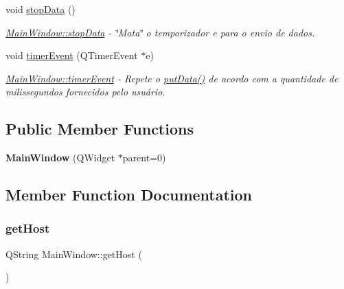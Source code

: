 \begin{DoxyCompactItemize}
void \mbox{\hyperlink{class_main_window_a79fdaf1fd769f0584f50da34e415b3de}{stop\+Data}} ()
\begin{DoxyCompactList}\small\item\em \mbox{\hyperlink{class_main_window_a79fdaf1fd769f0584f50da34e415b3de}{Main\+Window\+::stop\+Data}} -\/ \char`\"{}\+Mata\char`\"{} o temporizador e para o envio de dados. \end{DoxyCompactList}\item 
\mbox{\label{class_main_window_a9d08a694a5f9c532225754381b8011ea}} 
void \mbox{\hyperlink{class_main_window_a9d08a694a5f9c532225754381b8011ea}{timer\+Event}} (Q\+Timer\+Event $\ast$e)
\begin{DoxyCompactList}\small\item\em \mbox{\hyperlink{class_main_window_a9d08a694a5f9c532225754381b8011ea}{Main\+Window\+::timer\+Event}} -\/ Repete o \mbox{\hyperlink{class_main_window_afdfeb13ec363b0eb8ecacaf0aa13b605}{put\+Data()}} de acordo com a quantidade de milissegundos fornecidos pelo usuário. \end{DoxyCompactList}\end{DoxyCompactItemize}
\subsection*{Public Member Functions}
\begin{DoxyCompactItemize}
\item 
\mbox{\label{class_main_window_a8b244be8b7b7db1b08de2a2acb9409db}} 
{\bfseries Main\+Window} (Q\+Widget $\ast$parent=0)
\end{DoxyCompactItemize}


\subsection{Member Function Documentation}
\mbox{\label{class_main_window_a57a1f8959ed5f0eee73281829b2331fa}} 
\subsubsection{\texorpdfstring{get\+Host}{getHost}}
{\footnotesize\ttfamily Q\+String Main\+Window\+::get\+Host (\begin{DoxyParamCaption}{ }\end{DoxyParamCaption})\hspace{0.3cm}{\ttfamily [slot]}}



